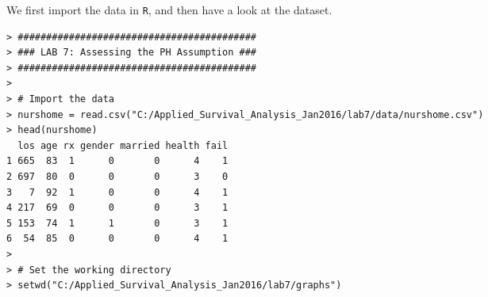 We first import the data in \verb|R|, and then have a look at the dataset.
\begin{spacing}{1.2}
\begin{footnotesize}
\begin{verbatim}
> ##########################################
> ### LAB 7: Assessing the PH Assumption ###
> ##########################################
> 
> # Import the data
> nurshome = read.csv("C:/Applied_Survival_Analysis_Jan2016/lab7/data/nurshome.csv")
> head(nurshome)
  los age rx gender married health fail
1 665  83  1      0       0      4    1
2 697  80  0      0       0      3    0
3   7  92  1      0       0      4    1
4 217  69  0      0       0      3    1
5 153  74  1      1       0      3    1
6  54  85  0      0       0      4    1
> 
> # Set the working directory
> setwd("C:/Applied_Survival_Analysis_Jan2016/lab7/graphs")
\end{verbatim}
\end{footnotesize}
\end{spacing}
